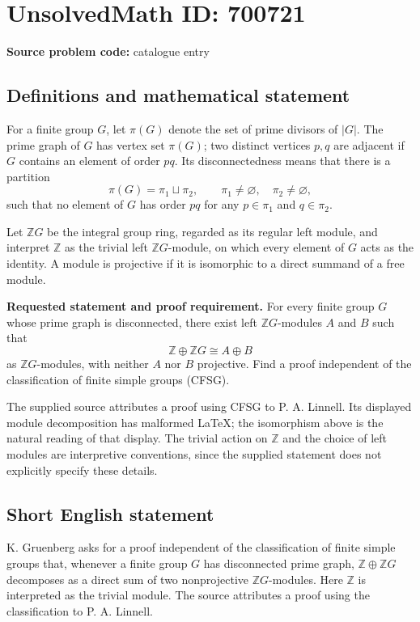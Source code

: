\documentclass[11pt]{article}
\newcommand{\Z}{\mathbb{Z}}
\begin{document}
\section*{UnsolvedMath ID: 700721}
\textbf{Source problem code:} catalogue entry
\subsection{Definitions and mathematical statement}
For a finite group \(G\), let \(\pi(G)\) denote the set of prime divisors of \(|G|\). The prime graph of \(G\) has vertex set \(\pi(G)\); two distinct vertices \(p,q\) are adjacent if \(G\) contains an element of order \(pq\). Its disconnectedness means that there is a partition
\[
\pi(G)=\pi_1\sqcup\pi_2,\qquad \pi_1\ne\varnothing,\quad \pi_2\ne\varnothing,
\]
such that no element of \(G\) has order \(pq\) for any \(p\in\pi_1\) and \(q\in\pi_2\).

Let \(\Z G\) be the integral group ring, regarded as its regular left module, and interpret \(\Z\) as the trivial left \(\Z G\)-module, on which every element of \(G\) acts as the identity. A module is projective if it is isomorphic to a direct summand of a free module.

\textbf{Requested statement and proof requirement.} For every finite group \(G\) whose prime graph is disconnected, there exist left \(\Z G\)-modules \(A\) and \(B\) such that
\[
\Z\oplus\Z G\cong A\oplus B
\]
as \(\Z G\)-modules, with neither \(A\) nor \(B\) projective. Find a proof independent of the classification of finite simple groups (CFSG).

The supplied source attributes a proof using CFSG to P. A. Linnell. Its displayed module decomposition has malformed LaTeX; the isomorphism above is the natural reading of that display. The trivial action on \(\Z\) and the choice of left modules are interpretive conventions, since the supplied statement does not explicitly specify these details.
\subsection{Short English statement}
K. Gruenberg asks for a proof independent of the classification of finite simple groups that, whenever a finite group \(G\) has disconnected prime graph, \(\Z\oplus\Z G\) decomposes as a direct sum of two nonprojective \(\Z G\)-modules. Here \(\Z\) is interpreted as the trivial module. The source attributes a proof using the classification to P. A. Linnell.
\end{document}

